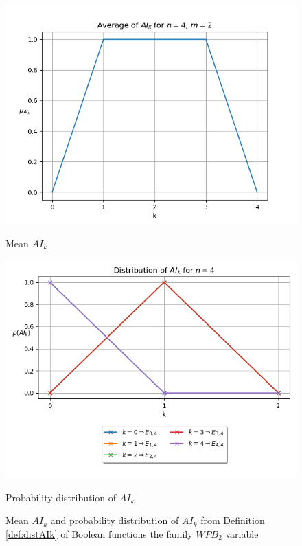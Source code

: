 \documentclass[11pt]{llncs}
\begin{document}
\begin{figure}[ht]
    \centering
    \begin{minipage}[b]{0.45\textwidth}
        \centering
        \includegraphics[width=\textwidth]{images/WPB_2_sample_size_full_dist.png}
        \caption{Mean $AI_k$}
        \label{fig:averagesFullDist}
    \end{minipage}
    \hfill
    \begin{minipage}[b]{0.5\textwidth}
        \centering
        \includegraphics[width=\textwidth]{images/WPB_2_sample_size_full_dist_prob.png}
        \caption{Probability distribution of $AI_k$}
        \label{fig:probFullDist}
    \end{minipage}
    \caption{Mean $AI_k$ and probability distribution of $AI_k$ from Definition \ref{def:distAIk} of Boolean functions the family $WPB_2$ variable}
    \label{fig:dullDist}
\end{figure}
\end{document}
